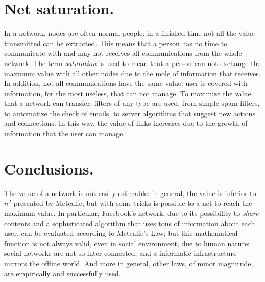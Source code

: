 \documentclass[12pt, a4page]{article}
\begin{document}
\section{Net saturation.}
In a network, nodes are often normal people: in a finished time not all the value transmitted can be extracted.
This means that a person has no time to communicate with and may not receives all communications from the whole network.
The term \textit{saturation} is used to mean that a person can not exchange the maximum value with all other nodes due to the mole of information that receives.
In addition, not all communications have the same value: user is covered with information, for the most useless, that can not manage. \newline
To maximize the value that a network can transfer, filters of any type are used: from simple spam filters, to automatize the check of emails, to server algorithms that suggest new actions and connections.
In this way, the value of links increases due to the growth of information that the user can manage. \newline

\section{Conclusions.}
The value of a network is not easily estimable: in general, the value is inferior to $n^2$ presented by Metcalfe, but with some tricks is possible to a net to reach the maximum value.
In particular, Facebook's network, due to its possibility to \textit{share} contents and a sophisticated algorithm that uses tons of information about each user, can be evaluated according to Metcalfe's Law; but this mathematical function is not always valid, even in social environment, due to human nature: social networks are not so inter-connected, and a informatic infrastructure mirrors the offline world. 
And more in general, other laws, of minor magnitude, are empirically and successfully used.
\newpage
\end{document}
